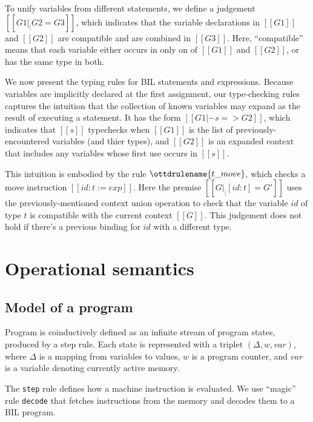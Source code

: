 \documentclass[11pt]{article}
\begin{document}
To unify variables from different statements, we define a judgement
$[[G1 |_| G2 = G3]]$, which indicates that the variable declarations
in $[[G1]]$ and $[[G2]]$ are compatible and are combined in $[[G3]]$.
Here, ``compatible'' means that each variable either occurs in only on
of $[[G1]]$ and $[[G2]]$, or has the same type in both.

\ottdefnsctxXXjoin

We now present the typing rules for BIL statements and expressions.
Because variables are implicitly declared at the first assignment, our
type-checking rules captures the intuition that the collection of known
variables may expand as the result of executing a statement.  It has
the form $[[G1 |- s => G2]]$, which indicates that $[[s]]$ typechecks
when $[[G1]]$ is the list of previously-encountered variables (and
thier types), and $[[G2]]$ is an expanded context that includes any
variables whose first use occurs in $[[s]]$.

This intuition is embodied by the rule $\ottdrulename{t\_move}$, which
checks a move instruction $[[id:t := exp]]$.  Here the premise $[[G
    |_| [id:t] = G' ]]$ uses the previously-mentioned context union
operation to check that the variable $id$ of type $t$ is compatible
with the current context $[[G]]$.  This judgement does not hold if
there's a previous binding for $id$ with a different type.

\ottdefnstypingXXstmt

\ottdefnstypingXXexp

\clearpage


\section{Operational semantics}

\subsection{Model of a program}

Program is coinductively defined as an infinite stream of program
states, produced by a step rule. Each state is represented with a
triplet $(\Delta, w, var)$, where $\Delta$ is a mapping from variables
to values, $w$ is a program counter, and $var$ is a variable
denoting currently active memory.

The \verb|step| rule defines how a machine instruction is
evaluated. We use ``magic'' rule \verb|decode| that fetches
instructions from the memory and decodes them to a BIL program.
\end{document}

